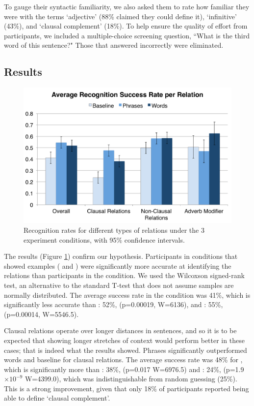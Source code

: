  To gauge their syntactic familiarity, we also asked them to rate how familiar they were with the terms `adjective' (88\% claimed they could define it), `infinitive' (43\%), and `clausal complement' (18\%). To help ensure the quality of effort from participants, we included a multiple-choice screening question, ``What is the third word of this sentence?"  Those that answered incorrectly were eliminated.

\subsection{Results}
\begin{figure}
\centering
\includegraphics[width=\columnwidth]{fig/results}
\caption{\label{fig:results} Recognition rates for different types of relations under the 3 experiment conditions, with 95\% confidence intervals.}
\end{figure}

The results (Figure \ref{fig:results}) confirm our hypothesis. Participants in conditions that showed examples ( and ) were significantly more accurate at identifying the relations than participants in the  condition. We used the Wilcoxson signed-rank test, an alternative to the standard T-test that does not assume samples are normally distributed. The average success rate in the  condition was 41\%, which is significantly less accurate than : 52\%, (p=0.00019, W=6136), and : 55\%, (p=0.00014, W=5546.5).

Clausal relations operate over longer distances in sentences, and so it is to be expected that showing longer stretches of context would perform better in these cases; that is indeed what the results showed.
Phrases significantly outperformed words and baseline for clausal relations. The average success rate was 48\% for , which is significantly more than : 38\%, (p=0.017 W=6976.5) and : 24\%, (p=1.9$\times 10^{-9}$ W=4399.0), which was indistinguishable from random guessing (25\%). This is a  strong improvement, given that only 18\% of participants reported being able to define  `clausal complement'.

